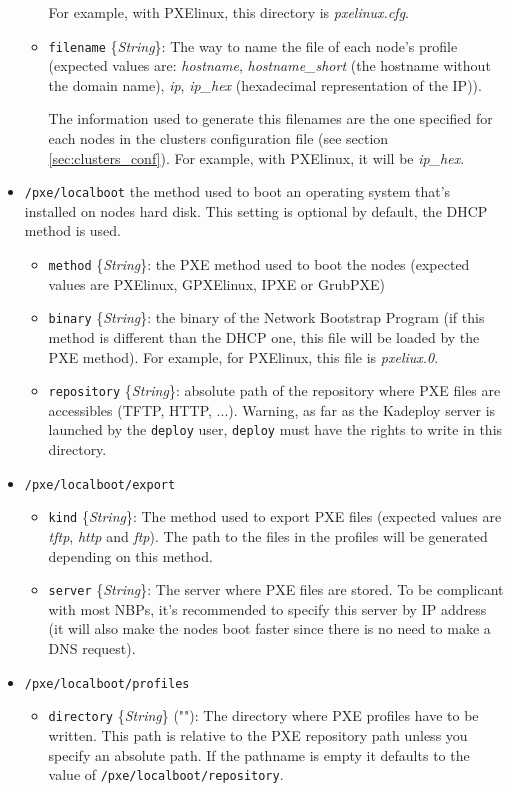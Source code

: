 \documentclass[a4wide,10pt,oneside]{book}
\newcommand{\ypath}[1]{\texttt{#1}}
\newcommand{\yfield}[2]{\texttt{#1} {\small\{{\emph{#2}}\}}:}
\newcommand{\yfieldd}[3]{\texttt{#1} {\small\{{\emph{#2}}\}} {\small(}#3{\small)}:}
\begin{document}
\begin{itemize}
\begin{itemize}
For example, with PXElinux, this directory is \emph{pxelinux.cfg}.
    \item \yfield{filename}{String} The way to name the file of each node's profile (expected values are: \emph{hostname}, \emph{hostname\_short} (the hostname without the domain name), \emph{ip}, \emph{ip\_hex} (hexadecimal representation of the IP)).

The information used to generate this filenames are the one specified for each nodes in the clusters configuration file (see section \ref{sec:clusters_conf}). For example, with PXElinux, it will be \emph{ip\_hex}.
  \end{itemize}

  \item \ypath{/pxe/localboot} the method used to boot an operating system that's installed on nodes hard disk. This setting is optional by default, the DHCP method is used.
  \begin{itemize}
    \item \yfield{method}{String} the PXE method used to boot the nodes (expected values are PXElinux, GPXElinux, IPXE or GrubPXE)
    \item \yfield{binary}{String} the binary of the Network Bootstrap Program (if this method is different than the DHCP one, this file will be loaded by the PXE method). For example, for PXElinux, this file is \emph{pxeliux.0}.
    \item \yfield{repository}{String} absolute path of the repository where PXE files are accessibles (TFTP, HTTP, ...). Warning, as far as the Kadeploy server is launched by the \texttt{deploy} user, \texttt{deploy} must have the rights to write in this directory.
  \end{itemize}
  \item \ypath{/pxe/localboot/export}
  \begin{itemize}
    \item \yfield{kind}{String} The method used to export PXE files (expected values are \emph{tftp}, \emph{http} and \emph{ftp}). The path to the files in the profiles will be generated depending on this method.
    \item \yfield{server}{String} The server where PXE files are stored. To be complicant with most NBPs, it's recommended to specify this server by IP address (it will also make the nodes boot faster since there is no need to make a DNS request).
  \end{itemize}
  \item \ypath{/pxe/localboot/profiles}
  \begin{itemize}
    \item \yfieldd{directory}{String}{""} The directory where PXE profiles have to be written. This path is relative to the PXE repository path unless you specify an absolute path. If the pathname is empty it defaults to the value of \ypath{/pxe/localboot/repository}.


\end{itemize}
\end{itemize}
\end{document}
